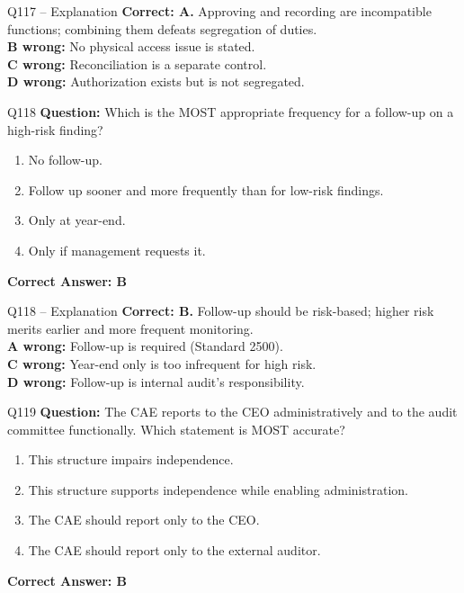 \documentclass[aspectratio=169,10pt]{beamer}
\begin{document}
	\begin{frame}[t]{Q117 -- Explanation}
		\small
		\textbf{Correct: A.} Approving and recording are incompatible functions; combining them defeats segregation of duties. \\[4pt]
		\textbf{B wrong:} No physical access issue is stated. \\[2pt]
		\textbf{C wrong:} Reconciliation is a separate control. \\[2pt]
		\textbf{D wrong:} Authorization exists but is not segregated.
	\end{frame}
	
	\begin{frame}[t]{Q118}
		\small
		\textbf{Question:} Which is the MOST appropriate frequency for a follow-up on a high-risk finding?
		\begin{enumerate}[label=\Alph*.,itemsep=1pt,topsep=2pt]
			\item No follow-up.
			\item Follow up sooner and more frequently than for low-risk findings.
			\item Only at year-end.
			\item Only if management requests it.
		\end{enumerate}
		\vspace{4pt}
		\textbf{Correct Answer: B}
	\end{frame}
	
	\begin{frame}[t]{Q118 -- Explanation}
		\small
		\textbf{Correct: B.} Follow-up should be risk-based; higher risk merits earlier and more frequent monitoring. \\[4pt]
		\textbf{A wrong:} Follow-up is required (Standard 2500). \\[2pt]
		\textbf{C wrong:} Year-end only is too infrequent for high risk. \\[2pt]
		\textbf{D wrong:} Follow-up is internal audit's responsibility.
	\end{frame}
	
	\begin{frame}[t]{Q119}
		\small
		\textbf{Question:} The CAE reports to the CEO administratively and to the audit committee functionally. Which statement is MOST accurate?
		\begin{enumerate}[label=\Alph*.,itemsep=1pt,topsep=2pt]
			\item This structure impairs independence.
			\item This structure supports independence while enabling administration.
			\item The CAE should report only to the CEO.
			\item The CAE should report only to the external auditor.
		\end{enumerate}
		\vspace{4pt}
		\textbf{Correct Answer: B}
	\end{frame}
	
\end{document}
